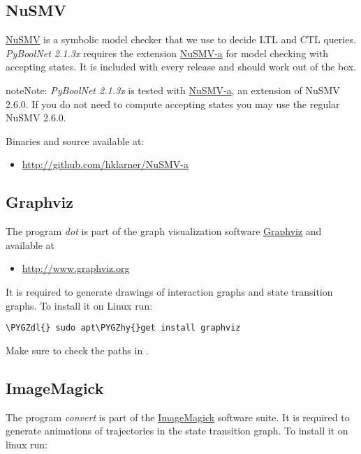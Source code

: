 \documentclass[letterpaper,10pt,english]{sphinxmanual}
\def\PYGZdl{\char`\$}
\def\PYGZhy{\char`\-}
\begin{document}
\subsection{NuSMV}
\label{Installation:nusmv}\label{Installation:installation-nusmv}
\href{http://nusmv.fbk.eu}{NuSMV} is a symbolic model checker that we use to decide LTL and CTL queries.
\emph{PyBoolNet 2.1.3x} requires the extension \href{https://github.com/hklarner/NuSMV-a}{NuSMV-a} for model checking with accepting states.
It is included with every release and should work out of the box.

\begin{notice}{note}{Note:}
\emph{PyBoolNet 2.1.3x} is tested with \href{https://github.com/hklarner/NuSMV-a}{NuSMV-a}, an extension of NuSMV 2.6.0. If you do not need to compute accepting states you may use the regular NuSMV 2.6.0.
\end{notice}

Binaries and source available at:
\begin{itemize}
\item {} 
\href{http://github.com/hklarner/NuSMV-a}{http://github.com/hklarner/NuSMV-a}

\end{itemize}


\subsection{Graphviz}
\label{Installation:graphviz}\label{Installation:installation-graphviz}
The program \emph{dot} is part of the graph visualization software \href{http://www.graphviz.org/}{Graphviz} and available at
\begin{itemize}
\item {} 
\href{http://www.graphviz.org}{http://www.graphviz.org}

\end{itemize}

It is required to generate drawings of interaction graphs and state transition graphs.
To install it on Linux run:

\begin{Verbatim}[commandchars=\\\{\}]
\PYGZdl{} sudo apt\PYGZhy{}get install graphviz
\end{Verbatim}

Make sure to check the paths in .


\subsection{ImageMagick}
\label{Installation:imagemagick}\label{Installation:installation-imagemagick}
The program \emph{convert} is part of the \href{http://www.imagemagick.org/script/index.php}{ImageMagick} software suite.
It is required to generate animations of trajectories in the state transition graph.
To install it on linux run:
\end{document}

